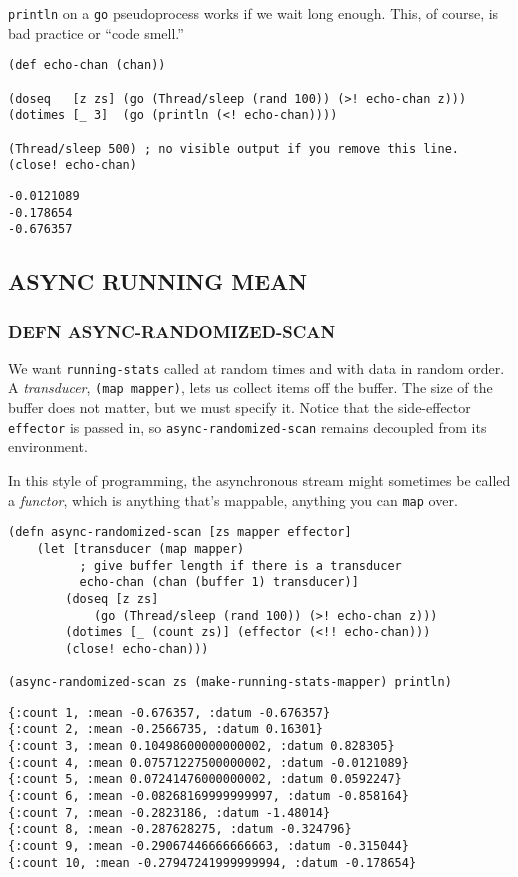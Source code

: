 \documentclass[10pt,oneside,x11names]{article}
\begin{document}
\texttt{println} on a \texttt{go} pseudoprocess works if we wait long enough. This, of
course, is bad practice or ``code smell.''

\begin{verbatim}
(def echo-chan (chan))

(doseq   [z zs] (go (Thread/sleep (rand 100)) (>! echo-chan z)))
(dotimes [_ 3]  (go (println (<! echo-chan))))

(Thread/sleep 500) ; no visible output if you remove this line.
(close! echo-chan)
\end{verbatim}

\begin{verbatim}
-0.0121089
-0.178654
-0.676357
\end{verbatim}

\subsection{ASYNC RUNNING MEAN}
\label{async-running-mean}
\subsubsection{DEFN ASYNC-RANDOMIZED-SCAN}
\label{async-randomized-scan}
We want \texttt{running-stats} called at random times and with data in random
order. A \emph{transducer}, \texttt{(map mapper)}, lets us collect items off the
buffer. The size of the buffer does not matter, but we must specify it.
Notice that the side-effector \texttt{effector} is passed in, so
\texttt{async-randomized-scan} remains decoupled from its environment.

In this style of programming, the asynchronous stream might sometimes be
called a \emph{functor}, which is anything that's mappable, anything you can
\texttt{map} over.

\begin{verbatim}
(defn async-randomized-scan [zs mapper effector]
    (let [transducer (map mapper)
          ; give buffer length if there is a transducer
          echo-chan (chan (buffer 1) transducer)]
        (doseq [z zs]
            (go (Thread/sleep (rand 100)) (>! echo-chan z)))
        (dotimes [_ (count zs)] (effector (<!! echo-chan)))
        (close! echo-chan)))

(async-randomized-scan zs (make-running-stats-mapper) println)
\end{verbatim}

\begin{verbatim}
{:count 1, :mean -0.676357, :datum -0.676357}
{:count 2, :mean -0.2566735, :datum 0.16301}
{:count 3, :mean 0.10498600000000002, :datum 0.828305}
{:count 4, :mean 0.07571227500000002, :datum -0.0121089}
{:count 5, :mean 0.07241476000000002, :datum 0.0592247}
{:count 6, :mean -0.08268169999999997, :datum -0.858164}
{:count 7, :mean -0.2823186, :datum -1.48014}
{:count 8, :mean -0.287628275, :datum -0.324796}
{:count 9, :mean -0.29067446666666663, :datum -0.315044}
{:count 10, :mean -0.27947241999999994, :datum -0.178654}
\end{verbatim}
\end{document}
